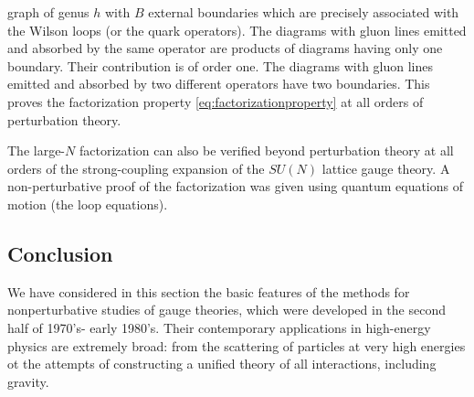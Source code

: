 graph of genus $h$ with $B$ external boundaries which are precisely associated 
with the Wilson loops (or the quark operators). The diagrams with gluon lines
emitted and absorbed by the same operator are products of diagrams having
only one boundary. Their contribution is of order one. The diagrams with gluon
lines emitted and absorbed by two different operators have two boundaries.
This proves the factorization property \eqref{eq:factorizationproperty} at all
orders of perturbation theory.
\par The large-$N$ factorization can also be verified beyond perturbation
theory at all orders  of the strong-coupling expansion of the $SU(N)$ lattice
gauge theory. A non-perturbative proof of the factorization was given using 
quantum equations of motion (the loop equations).
\subsection{Conclusion}
We have considered in this section the basic features of the methods for
nonperturbative studies of gauge theories, which were developed in the
second half of 1970's- early 1980's. Their contemporary applications in
high-energy physics are extremely broad: from the scattering of particles at
very high energies ot the attempts of constructing a unified theory of all
interactions, including gravity.

